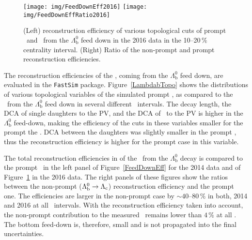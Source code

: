 \begin{figure}[!htb]
\centering
\texttt{[image: img/FeedDownEff2016]}
\texttt{[image: img/FeedDownEffRatio2016]}
\caption[Reconstruction efficiency of various topological cuts of prompt and non-prompt \Lambdac\ for 2016.]{\label{FeedDownEff2016} (Left) reconstruction efficiency of various topological cuts of prompt \Lambdac\ and \Lambdac\ from the $\Lambda_\mathrm{b}^0$ feed down in the 2016 data in the 10--20$\,\%$ centrality interval. (Right) Ratio of the non-prompt and prompt reconstruction efficiencies.}
\end{figure}

The reconstruction efficiencies of the \Lambdac, coming from the $\Lambda_\mathrm{b}^0$ feed down, are evaluated in the \texttt{FastSim} package. Figure~\ref{LambdabTopo} shows the distributions of various topological variables of the simulated prompt \Lambdac, as compared to the \Lambdac\ from the $\Lambda_\mathrm{b}^0$ feed down in several different \pt\ intervals. The decay length, the DCA of single daughters to the PV, and the DCA of \Lambdac\ to the PV is higher in the $\Lambda_\mathrm{b}^0$ feed-down, making the efficiency of the cuts in these variables smaller for the prompt the \Lambdac\@. DCA between the daughters was slightly smaller in the prompt \Lambdac, thus the reconstruction efficiency is higher for the prompt case in this variable\@.


The total reconstruction efficiencies in of the \Lambdac\ from the $\Lambda_\mathrm{b}^0$ decay is compared to the prompt \Lambdac\ in the left panel of Figure~\ref{FeedDownEff} for the 2014 data and of Figure~\ref{FeedDownEff2016} in the 2016 data. The right panels of these figures show the ratios between the non-prompt ($\Lambda_\mathrm{b}^0 \rightarrow {\Lambda_\text{c}}$) reconstruction efficiency and the prompt one. The efficiencies are larger in the non-prompt case by $\sim 40$--80$\,\%$ in both, 2014 and 2016 at all \pt\ intervals. With the reconstruction efficiency taken into account, the non-prompt contribution to the measured \Lambdac\ remains lower than $4\,\%$ at all \pt\@. The bottom feed-down is, therefore, small and is not propagated into the final uncertainties.
% 
% 

% 
% 
